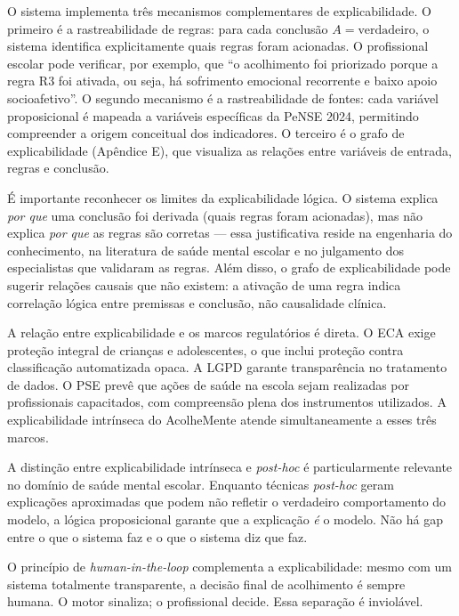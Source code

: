 \documentclass[
    12pt,
    openright,
    oneside,
    a4paper,
    english,
    brazil
]{abntex2}
\begin{document}
O sistema implementa três mecanismos complementares de explicabilidade. O primeiro é a rastreabilidade de regras: para cada conclusão $A = \text{verdadeiro}$, o sistema identifica explicitamente quais regras foram acionadas. O profissional escolar pode verificar, por exemplo, que ``o acolhimento foi priorizado porque a regra R3 foi ativada, ou seja, há sofrimento emocional recorrente e baixo apoio socioafetivo''. O segundo mecanismo é a rastreabilidade de fontes: cada variável proposicional é mapeada a variáveis específicas da PeNSE 2024, permitindo compreender a origem conceitual dos indicadores. O terceiro é o grafo de explicabilidade (Apêndice E), que visualiza as relações entre variáveis de entrada, regras e conclusão.

É importante reconhecer os limites da explicabilidade lógica. O sistema explica \textit{por que} uma conclusão foi derivada (quais regras foram acionadas), mas não explica \textit{por que} as regras são corretas --- essa justificativa reside na engenharia do conhecimento, na literatura de saúde mental escolar e no julgamento dos especialistas que validaram as regras. Além disso, o grafo de explicabilidade pode sugerir relações causais que não existem: a ativação de uma regra indica correlação lógica entre premissas e conclusão, não causalidade clínica.

A relação entre explicabilidade e os marcos regulatórios é direta. O ECA \cite{brasil_eca_1990} exige proteção integral de crianças e adolescentes, o que inclui proteção contra classificação automatizada opaca. A LGPD \cite{brasil_lgpd_2018} garante transparência no tratamento de dados. O PSE \cite{brasil_pse_2007} prevê que ações de saúde na escola sejam realizadas por profissionais capacitados, com compreensão plena dos instrumentos utilizados. A explicabilidade intrínseca do AcolheMente atende simultaneamente a esses três marcos.

A distinção entre explicabilidade intrínseca e \textit{post-hoc} é particularmente relevante no domínio de saúde mental escolar. Enquanto técnicas \textit{post-hoc} geram explicações aproximadas que podem não refletir o verdadeiro comportamento do modelo, a lógica proposicional garante que a explicação \textit{é} o modelo. Não há gap entre o que o sistema faz e o que o sistema diz que faz.

O princípio de \textit{human-in-the-loop} complementa a explicabilidade: mesmo com um sistema totalmente transparente, a decisão final de acolhimento é sempre humana. O motor sinaliza; o profissional decide. Essa separação é inviolável.
\end{document}
